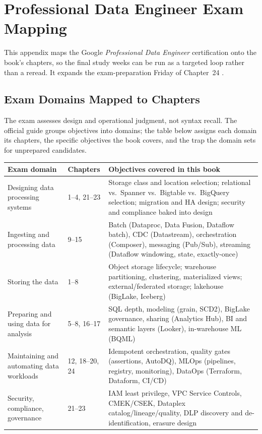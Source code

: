 \chapter{Professional Data Engineer Exam Mapping}
%
This appendix maps the Google \emph{Professional Data Engineer} certification onto the book's
chapters, so the final study weeks can be run as a targeted loop rather than a reread. It expands
the exam-preparation Friday of Chapter~24 \cite{googlecloudpdeexam}.

\section{Exam Domains Mapped to Chapters}
The exam assesses design and operational judgment, not syntax recall. The official guide groups
objectives into domains; the table below assigns each domain its chapters, the specific objectives
the book covers, and the trap the domain sets for unprepared candidates.

\begin{center}
\footnotesize
\begin{tabular}{@{}p{3.6cm}p{2.4cm}p{6.2cm}@{}}
\toprule
\textbf{Exam domain} & \textbf{Chapters} & \textbf{Objectives covered in this book} \\
\midrule
Designing data processing systems & 1--4, 21--23 & Storage class and location selection; relational vs.\ Spanner vs.\ Bigtable vs.\ BigQuery selection; migration and HA design; security and compliance baked into design \\
Ingesting and processing data & 9--15 & Batch (Dataproc, Data Fusion, Dataflow batch), CDC (Datastream), orchestration (Composer), messaging (Pub/Sub), streaming (Dataflow windowing, state, exactly-once) \\
Storing the data & 1--8 & Object storage lifecycle; warehouse partitioning, clustering, materialized views; external/federated storage; lakehouse (BigLake, Iceberg) \\
Preparing and using data for analysis & 5--8, 16--17 & SQL depth, modeling (grain, SCD2), BigLake governance, sharing (Analytics Hub), BI and semantic layers (Looker), in-warehouse ML (BQML) \\
Maintaining and automating data workloads & 12, 18--20, 24 & Idempotent orchestration, quality gates (assertions, AutoDQ), MLOps (pipelines, registry, monitoring), DataOps (Terraform, Dataform, CI/CD) \\
Security, compliance, governance & 21--23 & IAM least privilege, VPC Service Controls, CMEK/CSEK, Dataplex catalog/lineage/quality, DLP discovery and de-identification, erasure design \\
\bottomrule
\end{tabular}
\end{center}

